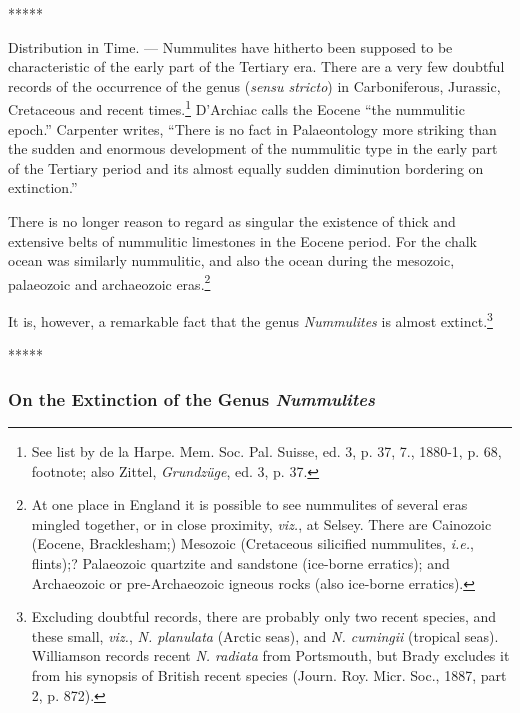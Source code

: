 \documentclass[a4paper, 12pt, oneside]{article}
\begin{document}
\centerline{*\hspace{15mm}*\hspace{15mm}*\hspace{15mm}*\hspace{15mm}*}
\bigskip

Distribution in Time. --- Nummulites have hitherto been supposed to be characteristic of the early part of the Tertiary era. There are a very few doubtful records of the occurrence of the genus (\emph{sensu stricto}) in Carboniferous, Jurassic, Cretaceous and recent times.\footnote{See list by de la Harpe. Mem. Soc. Pal. Suisse, ed. 3, p. 37, 7., 1880-1, p. 68, footnote; also Zittel, \emph{Grundzüge}, ed. 3, p. 37.} D'Archiac calls the Eocene ``the nummulitic epoch.'' Carpenter writes, ``There is no fact in Palaeontology more striking than the sudden and enormous development of the nummulitic type in the early part of the Tertiary period and its almost equally sudden diminution bordering on extinction.''

There is no longer reason to regard as singular the existence of thick and extensive belts of nummulitic limestones in the Eocene period. For the chalk ocean was similarly nummulitic, and also the ocean during the mesozoic, palaeozoic and archaeozoic eras.\footnote{At one place in England it is possible to see nummulites of several eras mingled together, or in close proximity, \emph{viz.}, at Selsey. There are Cainozoic (Eocene, Bracklesham;) Mesozoic (Cretaceous silicified nummulites, \emph{i.e.}, flints);? Palaeozoic quartzite and sandstone (ice-borne erratics); and Archaeozoic or pre-Archaeozoic igneous rocks (also ice-borne erratics).}

It is, however, a remarkable fact that the genus \emph{Nummulites} is almost extinct.\footnote{Excluding doubtful records, there are probably only two recent species, and these small, \emph{viz.}, \emph{N. planulata} (Arctic seas), and \emph{N. cumingii} (tropical seas). Williamson records recent \emph{N. radiata} from Portsmouth, but Brady excludes it from his synopsis of British recent species (Journ. Roy. Micr. Soc., 1887, part 2, p. 872).}

\centerline{*\hspace{15mm}*\hspace{15mm}*\hspace{15mm}*\hspace{15mm}*}
\bigskip

\subsubsection{On the Extinction of the Genus \emph{Nummulites}}
\end{document}
